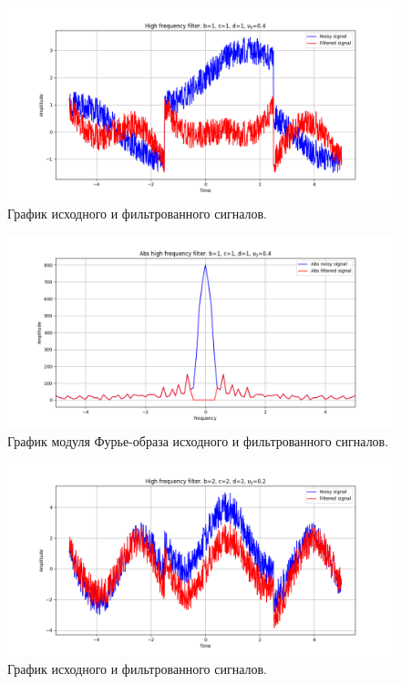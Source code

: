\documentclass[a4paper, 12pt]{article}
\begin{document}
    \begin{figure}[!htb]
        \centering
        \includegraphics[scale=0.485]{22_u_flt_u_nolow.png}
        \captionsetup{skip=0pt}
        \caption{График исходного и фильтрованного сигналов.}
        \label{fig:fig_a}
    \end{figure}
    \begin{figure}[!htb]
        \centering
        \includegraphics[scale=0.485]{22_abs_u_U_nolow.png}
        \captionsetup{skip=0pt}
        \caption{График модуля Фурье-образа исходного и фильтрованного сигналов.}
        \label{fig:fig_b}
    \end{figure}
    \begin{figure}[!htb]
        \centering
        \includegraphics[scale=0.485]{23_u_flt_u_nolow.png}
        \captionsetup{skip=0pt}
        \caption{График исходного и фильтрованного сигналов.}
        \label{fig:fig_c}
    \end{figure}
\end{document}
